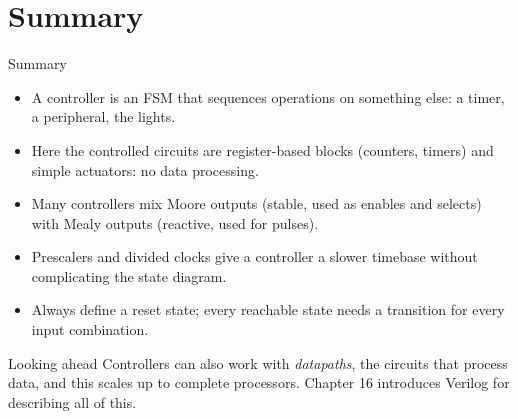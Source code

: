 \documentclass[9pt,aspectratio=169,xcolor=table]{beamer}
\begin{document}
\section{Summary}

\begin{frame}{Summary}
  \begin{itemize}\itemsep3pt\small
    \item A \alert{controller} is an FSM that sequences operations on something else: a timer, a peripheral, the lights.
    \item Here the controlled circuits are register-based blocks (counters, timers) and simple actuators: no data processing.
    \item Many controllers mix Moore outputs (stable, used as enables and selects) with Mealy outputs (reactive, used for pulses).
    \item Prescalers and divided clocks give a controller a slower timebase without complicating the state diagram.
    \item Always define a reset state; every reachable state needs a transition for every input combination.
  \end{itemize}
  \begin{block}{Looking ahead}
    Controllers can also work with \emph{datapaths}, the circuits that process data, and this scales up to complete processors. Chapter 16 introduces Verilog for describing all of this.
  \end{block}
\end{frame}
\end{document}
